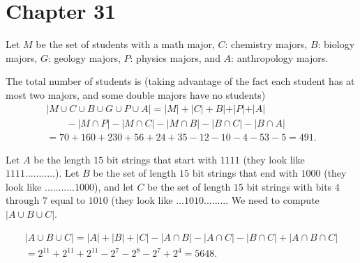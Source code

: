    \section*{Chapter 31}
    
\begin{Solution}{31.1}
Let $M$ be the set of students with a math major, $C$: chemistry majors, $B$: biology majors, $G$: geology majors, $P$: physics majors, and $A$: anthropology majors.

The total number of students is (taking advantage of the fact each student has at most two majors, and some double majors have no students)
\begin{gather*}
|M \cup C \cup B \cup G \cup P \cup A| = |M|+|C|+B|+|P|+|A| \\
\qquad - |M \cap P| - |M \cap C| - |M \cap B| - |B \cap C|  - |B \cap A| \\
= 70 + 160 +230+56+24+35 - 12-10-4-53-5 = 491.
\end{gather*}

\end{Solution}

\begin{Solution}{31.2}
Let $A$ be the length $15$  bit strings that start with $1111$ (they look like $1111...........$).
 Let $B$ be the set of length $15$ bit strings that end with $1000$ (they look like $...........1000$),
 and let $C$ be the set of length $15$ bit strings with bits $4$ through $7$ equal to $1010$ (they look like
 $...1010........$. We need to compute $|A \cup B \cup C|$. 
 
 \begin{gather*}
 |A\cup B \cup C| = |A| + |B| + |C| -|A \cap B| - |A \cap C| - |B \cap C| + |A \cap B \cap C|\\
 = 2^{11} + 2^{11} + 2^{11} - 2^7 -2^8 - 2^7 + 2^4 = 5648.
 \end{gather*}

\end{Solution}

